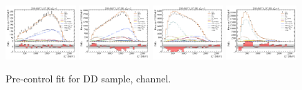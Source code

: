 \begin{figure}[htb]
    \includegraphics[width=0.24\textwidth]{./figs-supplemental-plots/pre-ctrl-fit/lines_q2_slices/fit_result-lines_q2_idx1-D0-dd-el.pdf}
    \includegraphics[width=0.24\textwidth]{./figs-supplemental-plots/pre-ctrl-fit/lines_q2_slices/fit_result-lines_q2_idx2-D0-dd-el.pdf}
    \includegraphics[width=0.24\textwidth]{./figs-supplemental-plots/pre-ctrl-fit/lines_q2_slices/fit_result-lines_q2_idx3-D0-dd-el.pdf}
    \includegraphics[width=0.24\textwidth]{./figs-supplemental-plots/pre-ctrl-fit/lines_q2_slices/fit_result-lines_q2_idx4-D0-dd-el.pdf}

    \caption{Pre-control fit for DD sample, \Dz channel.}
    \label{fig:pre-ctrl-dd-d0}
\end{figure}


